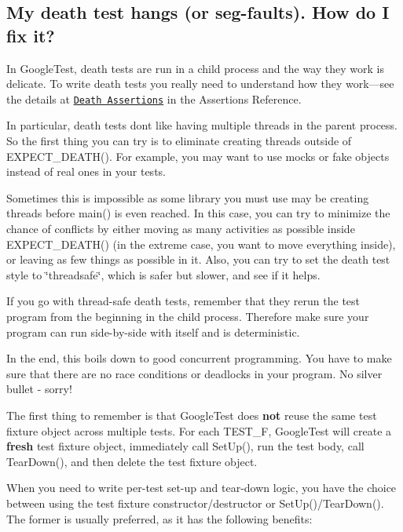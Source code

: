 \subsection*{My death test hangs (or seg-\/faults). How do I fix it?}

In Google\+Test, death tests are run in a child process and the way they work is delicate. To write death tests you really need to understand how they work—see the details at \href{reference/assertions.md#death}{\tt Death Assertions} in the Assertions Reference.

In particular, death tests don\textquotesingle{}t like having multiple threads in the parent process. So the first thing you can try is to eliminate creating threads outside of {\ttfamily E\+X\+P\+E\+C\+T\+\_\+\+D\+E\+A\+T\+H()}. For example, you may want to use mocks or fake objects instead of real ones in your tests.

Sometimes this is impossible as some library you must use may be creating threads before {\ttfamily main()} is even reached. In this case, you can try to minimize the chance of conflicts by either moving as many activities as possible inside {\ttfamily E\+X\+P\+E\+C\+T\+\_\+\+D\+E\+A\+T\+H()} (in the extreme case, you want to move everything inside), or leaving as few things as possible in it. Also, you can try to set the death test style to {\ttfamily \char`\"{}threadsafe\char`\"{}}, which is safer but slower, and see if it helps.

If you go with thread-\/safe death tests, remember that they rerun the test program from the beginning in the child process. Therefore make sure your program can run side-\/by-\/side with itself and is deterministic.

In the end, this boils down to good concurrent programming. You have to make sure that there are no race conditions or deadlocks in your program. No silver bullet -\/ sorry!

The first thing to remember is that Google\+Test does {\bfseries not} reuse the same test fixture object across multiple tests. For each {\ttfamily T\+E\+S\+T\+\_\+F}, Google\+Test will create a {\bfseries fresh} test fixture object, immediately call {\ttfamily Set\+Up()}, run the test body, call {\ttfamily Tear\+Down()}, and then delete the test fixture object.

When you need to write per-\/test set-\/up and tear-\/down logic, you have the choice between using the test fixture constructor/destructor or {\ttfamily Set\+Up()}/{\ttfamily Tear\+Down()}. The former is usually preferred, as it has the following benefits\+:


